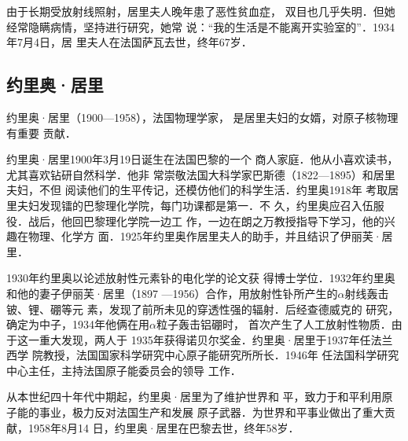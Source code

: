 由于长期受放射线照射，居里夫人晚年患了恶性贫血症，
双目也几乎失明．但她经常隐瞒病情，坚持进行研究，她常
说：“我的生活是不能离开实验室的”．1934年7月4日，居
里夫人在法国萨瓦去世，终年67岁．

\subsection{约里奥·居里}
约里奥·居里（1900—1958），法国物理学家，
是居里夫妇的女婿，对原子核物理有重要
贡献．

约里奥·居里1900年3月19日诞生在法国巴黎的一个
商人家庭．他从小喜欢读书，尤其喜欢钻研自然科学．他非
常崇敬法国大科学家巴斯德（1822—1895）和居里夫妇，不但
阅读他们的生平传记，还模仿他们的科学生活．约里奥1918年
考取居里夫妇发现镭的巴黎理化学院，每门功课都是第一．不
久，约里奥应召入伍服役．战后，他回巴黎理化学院一边工
作，一边在朗之万教授指导下学习，他的兴趣在物理、化学方
面．1925年约里奥作居里夫人的助手，并且结识了伊丽芙·居里．

1930年约里奥以论述放射性元素钋的电化学的论文获
得博士学位．1932年约里奥和他的妻子伊丽芙·居里（1897
—1956）合作，用放射性钋所产生的$\alpha$射线轰击铍、锂、硼等元
素，发现了前所未见的穿透性强的辐射．后经查德威克的
研究，确定为中子，1934年他俩在用$\alpha$粒子轰击铝硼时，
首次产生了人工放射性物质．由于这一重大发现，两人于
1935年获得诺贝尔奖金．约里奥·居里于1937年任法兰西学
院教授，法国国家科学研究中心原子能研究所所长．1946年
任法国科学研究中心主任，主持法国原子能委员会的领导
工作．

从本世纪四十年代中期起，约里奥·居里为了维护世界和
平，致力于和平利用原子能的事业，极力反对法国生产和发展
原子武器．为世界和平事业做出了重大贡献，1958年8月14
日，约里奥·居里在巴黎去世，终年58岁．

































































